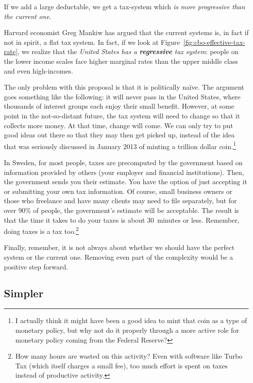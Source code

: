 If we add a large deductable, we get a tax-system which \emph{is more
progressive than the current one}.

Harvard economist Greg Mankiw has argued that the current systems is, in fact
if not in spirit, a flat tax system.
In fact, if we look at Figure~\ref{fig:cbo-effective-tax-rate}, we realize that
the \emph{United States has a \textbf{regressive} tax system}: people on the
lower income scales face higher marginal rates than the upper middle class and
even high-incomes.

The only problem with this proposal is that it is politically naïve. The
argument goes something like the following: it will never pass in the United
States, where thousands of interest groups each enjoy their small benefit.
However, at some point in the not-so-distant future, the tax system will need
to change so that it collects more money. At that time, change will come. We
can only try to put good ideas out there so that they may then get picked up,
instead of the idea that was seriously discussed in January 2013 of minting a
trillion dollar coin.\footnote{I actually think it might have been a good idea
to mint that coin as a type of monetary policy, but why not do it properly
through a more active role for monetary policy coming from the Federal
Reserve?}

In Sweden, for most people, taxes are precomputed by the government based on
information provided by others (your employer and financial institutions).
Then, the government sends you their estimate. You have the option of just
accepting it or submitting your own tax information. Of course, small business
owners or those who freelance and have many clients may need to file
separately, but for over 90\% of people, the government's estimate will be
acceptable. The result is that the time it takes to do your taxes is about
30~minutes or less. Remember, doing taxes is a tax too.\footnote{How many hours
are wasted on this activity? Even with software like Turbo Tax (which itself
charges a small fee), too much effort is spent on taxes instead of productive
activity.}%

Finally, remember, it is not always about whether we should have the perfect
system or the current one. Removing even part of the complexity would be a
positive step forward.

\subsection{Simpler}

